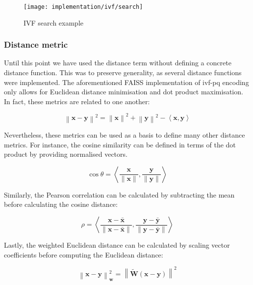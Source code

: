 \documentclass[../main.tex]{subfiles}
\begin{document}
\begin{figure}[htbp]
    \centering
    \texttt{[image: implementation/ivf/search]}
    \caption{IVF search example}
    \label{fig:4:ivf_search}
\end{figure}

\subsubsection{Distance metric}
Until this point we have used the distance term without defining a concrete distance function. This was to preserve generality, as several distance functions were implemented. The aforementioned FAISS implementation of \gls{ivf}-\gls{pq} encoding only allows for Euclidean distance minimisation and dot product maximisation. In fact, these metrics are related to one another:

\begin{equation}\label{eq:4:dot_l2}
    \left\lVert \bm{x} - \bm{y} \right\rVert^2 =
    \left\lVert \bm{x} \right\rVert^2 + \left\lVert \bm{y} \right\rVert^2 - \left\langle \bm{x},\bm{y} \right\rangle
\end{equation}

Nevertheless, these metrics can be used as a basis to define many other distance metrics. For instance, the cosine similarity can be defined in terms of the dot product by providing normalised vectors.

\begin{equation}\label{eq:4:cos}
    \cos \theta = \left\langle \frac{\bm{x}}{\lVert \bm{x} \rVert} , \frac{\bm{y}}{\lVert \bm{y} \rVert} \right\rangle
\end{equation}

Similarly, the Pearson correlation can be calculated by subtracting the mean before calculating the cosine distance:

\begin{equation}\label{eq:4:pearson}
    \rho = \left\langle \frac{\bm{x} - \bm{\bar{x}}}{\lVert \bm{x} - \bm{\bar{x}} \rVert} , \frac{\bm{y - \bm{\bar{y}}}}{\lVert \bm{y} - \bm{\bar{y}} \rVert} \right\rangle
\end{equation}

Lastly, the weighted Euclidean distance can be calculated by scaling vector coefficients before computing the Euclidean distance:

\begin{equation}\label{eq:4:l2_w}
    \left\lVert \bm{x} - \bm{y} \right\rVert^2_{\bm{w}} = \left\lVert \bm{\tilde{W}}(\bm{x} - \bm{y}) \right\rVert^2
\end{equation}
\end{document}
